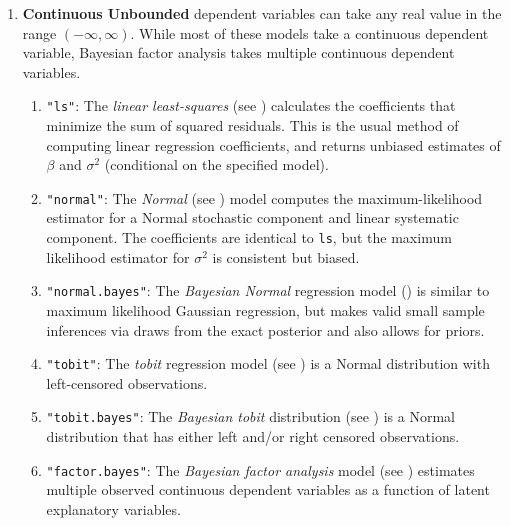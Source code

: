 \begin{enumerate}
\item {\bf Continuous Unbounded} dependent variables can take any
real value in the range $(-\infty, \infty)$. While most of these
models take a continuous dependent variable, Bayesian factor analysis takes multiple
continuous dependent variables.  

   \begin{enumerate}
   \item {\tt "ls"}: The {\it linear least-squares} (see )
     calculates the coefficients that minimize the sum of squared
     residuals.  This is the usual method of computing linear
     regression coefficients, and returns unbiased estimates of
     $\beta$ and $\sigma^2$ (conditional on the specified model).
   \item {\tt "normal"}: The {\it Normal} (see ) model
     computes the maximum-likelihood estimator for a Normal
     stochastic component and linear systematic component.  The
     coefficients are identical to \texttt{ls}, but the
     maximum likelihood estimator for $\sigma^2$ is consistent
     but biased.
   \item {\tt "normal.bayes"}:  The {\it Bayesian Normal} regression
model () is similar to maximum likelihood Gaussian
regression, but makes valid small sample inferences via draws from the
exact posterior and also allows for priors.  


  \item {\tt "tobit"}:  The {\it tobit} regression model (see 
  ) is a Normal distribution with left-censored observations.

  \item {\tt "tobit.bayes"}: The {\it Bayesian tobit} distribution
  (see ) is a Normal distribution that has either
  left and/or right censored observations.  

   \item {\tt "factor.bayes"}: The {\it Bayesian factor analysis} model (see
) estimates multiple observed continuous dependent variables
as a function of latent explanatory variables.  


\end{enumerate}
\end{enumerate}
